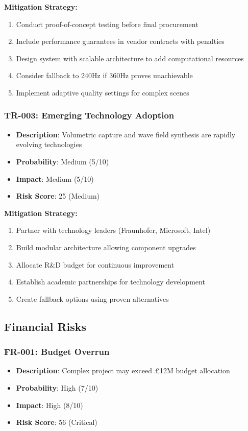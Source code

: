 \textbf{Mitigation Strategy:}
\begin{enumerate}
\item Conduct proof-of-concept testing before final procurement
\item Include performance guarantees in vendor contracts with penalties
\item Design system with scalable architecture to add computational resources
\item Consider fallback to 240Hz if 360Hz proves unachievable
\item Implement adaptive quality settings for complex scenes
\end{enumerate}

\subsubsection{TR-003: Emerging Technology Adoption}
\begin{itemize}
\item \textbf{Description}: Volumetric capture and wave field synthesis are rapidly evolving technologies
\item \textbf{Probability}: Medium (5/10)
\item \textbf{Impact}: Medium (5/10)
\item \textbf{Risk Score}: 25 (Medium)
\end{itemize}

\textbf{Mitigation Strategy:}
\begin{enumerate}
\item Partner with technology leaders (Fraunhofer, Microsoft, Intel)
\item Build modular architecture allowing component upgrades
\item Allocate R\&D budget for continuous improvement
\item Establish academic partnerships for technology development
\item Create fallback options using proven alternatives
\end{enumerate}

\subsection{Financial Risks}

\subsubsection{FR-001: Budget Overrun}
\begin{itemize}
\item \textbf{Description}: Complex project may exceed £12M budget allocation
\item \textbf{Probability}: High (7/10)
\item \textbf{Impact}: High (8/10)
\item \textbf{Risk Score}: 56 (Critical)
\end{itemize}

